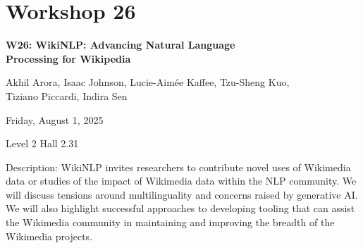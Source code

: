 \clearpage


\section[W26: WikiNLP: Advancing Natural Language Processing for Wikipedia]{Workshop 26}
\label{workshop_26}

\begin{center}
    {\Large \textbf{W26: WikiNLP: Advancing Natural Language \\
    Processing for Wikipedia}}\\
    
 \vspace{5mm}

Akhil Arora, Isaac Johnson, Lucie-Aimée Kaffee, Tzu-Sheng Kuo, \\
Tiziano Piccardi, Indira Sen\\

 \vspace{5mm}

    Friday, August 1, 2025

Level 2 Hall 2.31
    
\end{center}

Description: WikiNLP invites researchers to contribute novel uses of Wikimedia data or studies of the impact of Wikimedia data within the NLP community. We will discuss tensions around multilinguality and concerns raised by generative AI. We will also highlight successful approaches to developing tooling that can assist the Wikimedia community in maintaining and improving the breadth of the Wikimedia projects.

